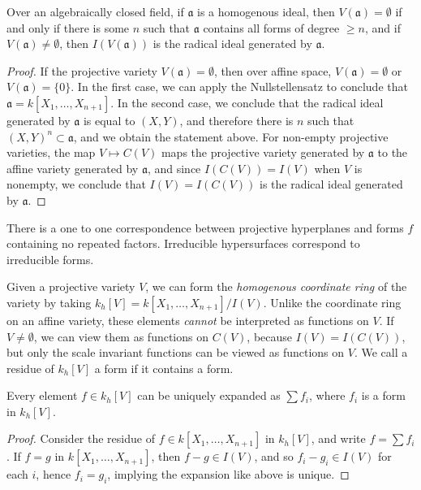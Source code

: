 \begin{theorem}
    Over an algebraically closed field, if $\mathfrak{a}$ is a homogenous ideal, then $V(\mathfrak{a}) = \emptyset$ if and only if there is some $n$ such that $\mathfrak{a}$ contains all forms of degree $\geq n$, and if $V(\mathfrak{a}) \neq \emptyset$, then $I(V(\mathfrak{a}))$ is the radical ideal generated by $\mathfrak{a}$.
\end{theorem}
\begin{proof}
    If the projective variety $V(\mathfrak{a}) = \emptyset$, then over affine space, $V(\mathfrak{a}) = \emptyset$ or $V(\mathfrak{a}) = \{ 0 \}$. In the first case, we can apply the Nullstellensatz to conclude that $\mathfrak{a} = k[X_1, \dots, X_{n+1}]$. In the second case, we conclude that the radical ideal generated by $\mathfrak{a}$ is equal to $(X,Y)$, and therefore there is $n$ such that $(X,Y)^n \subset \mathfrak{a}$, and we obtain the statement above. For non-empty projective varieties, the map $V \mapsto C(V)$ maps the projective variety generated by $\mathfrak{a}$ to the affine variety generated by $\mathfrak{a}$, and since $I(C(V)) = I(V)$ when $V$ is nonempty, we conclude that $I(V) = I(C(V))$ is the radical ideal generated by $\mathfrak{a}$.
\end{proof}

\begin{corollary}
    There is a one to one correspondence between projective hyperplanes and forms $f$ containing no repeated factors. Irreducible hypersurfaces correspond to irreducible forms.
\end{corollary}

Given a projective variety $V$, we can form the \emph{homogenous coordinate ring} of the variety by taking $k_h[V] = k[X_1, \dots, X_{n+1}]/I(V)$. Unlike the coordinate ring on an affine variety, these elements {\it cannot} be interpreted as functions on $V$. If $V \neq \emptyset$, we can view them as functions on $C(V)$, because $I(V) = I(C(V))$, but only the scale invariant functions can be viewed as functions on $V$. We call a residue of $k_h[V]$ a form if it contains a form.

\begin{prop}
    Every element $f \in k_h[V]$ can be uniquely expanded as $\sum f_i$, where $f_i$ is a form in $k_h[V]$.
\end{prop}
\begin{proof}
    Consider the residue of $f \in k[X_1, \dots, X_{n+1}]$ in $k_h[V]$, and write $f = \sum f_i$. If $f = g$ in $k[X_1, \dots, X_{n+1}]$, then $f - g \in I(V)$, and so $f_i - g_i \in I(V)$ for each $i$, hence $f_i = g_i$, implying the expansion like above is unique.
\end{proof}

